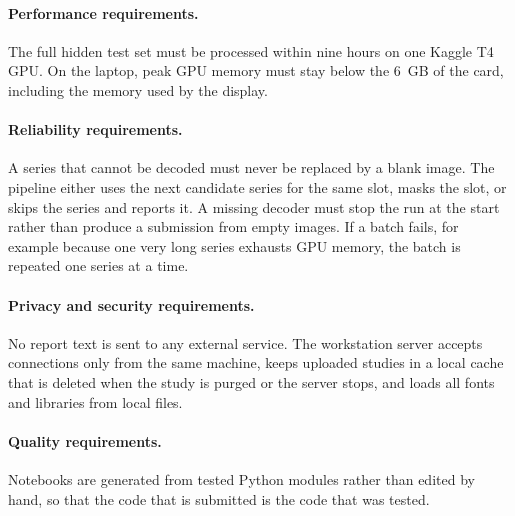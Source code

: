 \paragraph{Performance requirements.} The full hidden test set must be processed within nine hours on one Kaggle T4 GPU. On the laptop, peak GPU memory must stay below the 6~GB of the card, including the memory used by the display.

\paragraph{Reliability requirements.} A series that cannot be decoded must never be replaced by a blank image. The pipeline either uses the next candidate series for the same slot, masks the slot, or skips the series and reports it. A missing decoder must stop the run at the start rather than produce a submission from empty images. If a batch fails, for example because one very long series exhausts GPU memory, the batch is repeated one series at a time.

\paragraph{Privacy and security requirements.} No report text is sent to any external service. The workstation server accepts connections only from the same machine, keeps uploaded studies in a local cache that is deleted when the study is purged or the server stops, and loads all fonts and libraries from local files.

\paragraph{Quality requirements.} Notebooks are generated from tested Python modules rather than edited by hand, so that the code that is submitted is the code that was tested.
